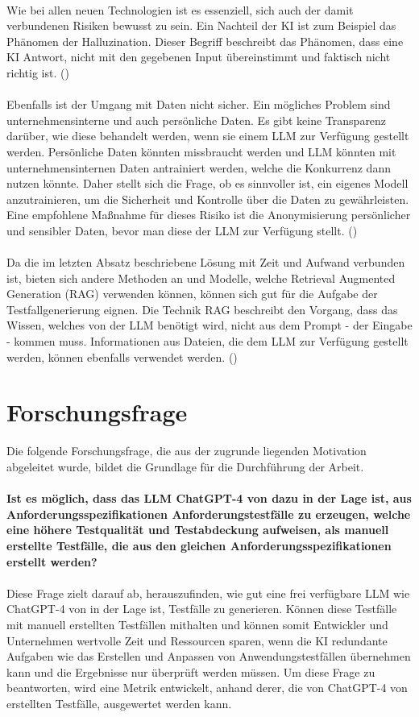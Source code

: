 \documentclass[12pt,toc=bib,toc=listof]{scrreprt}
\begin{document}
\\
Wie bei allen neuen Technologien ist es essenziell, sich auch der damit verbundenen Risiken bewusst zu sein. Ein Nachteil der KI ist zum Beispiel das Phänomen der Halluzination. Dieser Begriff beschreibt das Phänomen, dass eine KI Antwort, nicht mit den gegebenen Input übereinstimmt und faktisch nicht richtig ist. (\cite{Siebert2024})\\
\\
Ebenfalls ist der Umgang mit Daten nicht sicher. Ein mögliches Problem sind unternehmensinterne und auch persönliche Daten. Es gibt keine Transparenz darüber, wie diese behandelt werden, wenn sie einem LLM zur Verfügung gestellt werden. Persönliche Daten könnten missbraucht werden und LLM könnten mit unternehmensinternen Daten antrainiert werden, welche die Konkurrenz dann nutzen könnte. Daher stellt sich die Frage, ob es sinnvoller ist, ein eigenes Modell anzutrainieren, um die Sicherheit und Kontrolle über die Daten zu gewährleisten. Eine empfohlene Maßnahme für dieses Risiko ist die Anonymisierung persönlicher und sensibler Daten, bevor man diese der LLM zur Verfügung stellt. (\cite{Möllers2024})\\
\\
Da die im letzten Absatz beschriebene Lösung mit Zeit und Aufwand verbunden ist, bieten sich andere Methoden an und Modelle, welche Retrieval Augmented Generation (RAG) verwenden können, können sich gut für die Aufgabe der Testfallgenerierung eignen. Die Technik RAG beschreibt den Vorgang, dass das Wissen, welches von der LLM benötigt wird, nicht aus dem Prompt - der Eingabe - kommen muss. Informationen aus Dateien, die dem LLM zur Verfügung gestellt werden, können ebenfalls verwendet werden. (\cite{Honroth2024})

\section{Forschungsfrage} %
\label{sec:forschungsfrage}
Die folgende Forschungsfrage, die aus der zugrunde liegenden Motivation abgeleitet wurde, bildet die Grundlage für die Durchführung der Arbeit.\\
\\
\textbf{Ist es möglich, dass das LLM ChatGPT-4 von \textcite{OpenAI2025} dazu in der Lage ist, aus Anforderungsspezifikationen Anforderungstestfälle zu erzeugen, welche eine höhere Testqualität und Testabdeckung aufweisen, als manuell erstellte Testfälle, die aus den gleichen Anforderungsspezifikationen erstellt werden?}\\  
\\
Diese Frage zielt darauf ab, herauszufinden, wie gut eine frei verfügbare LLM wie ChatGPT-4 von \textcite{OpenAI2025} in der Lage ist, Testfälle zu generieren. Können diese Testfälle mit manuell erstellten Testfällen mithalten und können somit Entwickler und Unternehmen wertvolle Zeit und Ressourcen sparen, wenn die KI redundante Aufgaben wie das Erstellen und Anpassen von Anwendungstestfällen übernehmen kann und die Ergebnisse nur überprüft werden müssen. Um diese Frage zu beantworten, wird eine Metrik entwickelt, anhand derer, die von ChatGPT-4 von \textcite{OpenAI2025} erstellten Testfälle, ausgewertet werden kann.
\newpage
\end{document}
